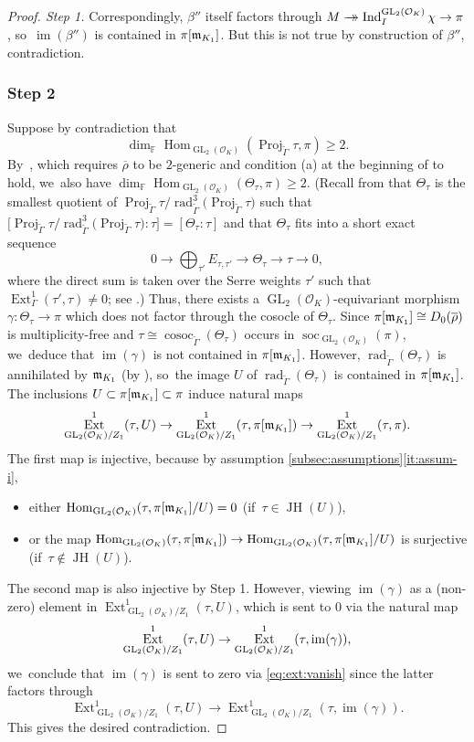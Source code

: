 \documentclass[JEP,XML,SOM,Unicode,NoFloatCountersInSection, NoEqCountersInSection,published]{cedram}
\newcommand{\onto}{\mathchoice{\to\hspace*{-5mm}\to}{\mathrel{\hbox{$\to\hspace*{-2.85mm}\to$}}}{\to\hspace*{-3mm}\to}{\to\hspace*{-3mm}\to}}
\let\wt\widetilde
\newcommand{\F}{\mathbb{F}}
\newcommand{\cO}{\mathcal{O}}
\newcommand{\brho}{\overline{\rho}}
\DeclareMathOperator{\cosoc}{cosoc}
\DeclareMathOperator{\Ext}{Ext}
\DeclareMathOperator{\GL}{GL}
\DeclareMathOperator{\Hom}{Hom}
\DeclareMathOperator{\im}{im}
\DeclareMathOperator{\Ind}{Ind}
\DeclareMathOperator{\JH}{\mathrm{JH}}
\DeclareMathOperator{\Proj}{Proj}
\DeclareMathOperator{\rad}{rad}
\DeclareMathOperator{\soc}{soc}
\theoremstyle{plain}
\theoremstyle{definition}
\begin{document}
\begin{proof}[Proof. Step 1]
Correspondingly, $\beta''$ itself factors through $M\onto \Ind_I^{\GL_2(\cO_K)}\chi\to \pi$, so~$\im(\beta'')$ is contained in $\pi[\mathfrak{m}_{K_1}]$. But this is not true by construction of $\beta''$, contradiction.

\subsubsection*{Step 2} Suppose by contradiction that
\[
\dim_{\F}\Hom_{\GL_2(\cO_K)}(\Proj_{\wt{\Gamma}}\tau,\pi)\geq 2.
\]
By~\cite[Prop.\,4.18]{HuWang2}, which requires $\brho$ to be $2$-generic and condition (a) at the beginning of \cite[\S 4.3]{HuWang2} to hold, we~also have $\dim_{\F}\Hom_{\GL_2(\cO_K)}(\Theta_{\tau},\pi)\geq 2$.
(Recall from \cite[\S 3.3]{HuWang2} that $\Theta_{\tau}$ is the smallest quotient of $\Proj_{\wt{\Gamma}}\tau/\rad^3_{\wt{\Gamma}}\bigl(\Proj_{\wt{\Gamma}}\tau\bigr)$ such that
$\big[\Proj_{\wt{\Gamma}}\tau/\rad^3_{\wt{\Gamma}}\bigl(\Proj_{\wt{\Gamma}}\tau\bigr):\tau\big]=[\Theta_{\tau}:\tau]$
and that $\Theta_{\tau}$ fits into a short exact sequence
\[
0\to \bigoplus_{\tau'}E_{\tau,\tau'}\to \Theta_{\tau}\to \tau\to 0,
\]
where the direct sum is taken over the Serre weights $\tau'$ such that \hbox{$\Ext^1_{\Gamma}(\tau',\tau)\neq0$}; see \cite[Cor.\,3.16]{HuWang2}.)
Thus, there exists a $\GL_2(\cO_K)$-equivariant morphism $\gamma:\Theta_{\tau}\to \pi$ which does not factor through the cosocle of $\Theta_\tau$. Since $\pi[\m_{K_1}]\cong D_0(\brho)$ is multiplicity-free and $\tau\cong \cosoc_{\wt{\Gamma}}(\Theta_\tau)$ occurs in $\soc_{\GL_2(\cO_K)}(\pi)$, we~deduce that $\im(\gamma)$ is not contained in $\pi[\mathfrak{m}_{K_1}]$. However, $\rad_{\wt{\Gamma}}(\Theta_\tau)$ is annihilated by $\mathfrak{m}_{K_1}$ (by \cite[Cor.\,3.16]{HuWang2}), so~the image $U$ of $\rad_{\wt{\Gamma}}(\Theta_\tau)$ is contained in $\pi[\mathfrak{m}_{K_1}]$. The inclusions $U\subset \pi[\mathfrak{m}_{K_1}]\subset \pi$ induce natural maps
\begin{equation}
\label{eq:ext:vanish}
\Ext^1_{\GL_2(\cO_K)/Z_1}(\tau,U)\to \Ext^1_{\GL_2(\cO_K)/Z_1}(\tau,\pi[\m_{K_1}])\to \Ext^1_{\GL_2(\cO_K)/Z_1}(\tau,\pi).
\end{equation}
The first map is injective, because by assumption \ref{subsec:assumptions}\eqref{it:assum-i},
\begin{itemize}
\item
either $\Hom_{\GL_2(\cO_K)}(\tau,\pi[\m_{K_1}]/U)=0$ (if~$\tau\in\JH(U)$),
\item
or the map $\Hom_{\GL_2(\cO_K)}(\tau,\pi[\m_{K_1}])\to \Hom_{\GL_2(\cO_K)}(\tau,\pi[\m_{K_1}]/U)$ is surjective (if~$\tau\notin \JH(U)$).
\end{itemize}
The second map is also injective by Step 1. However, viewing $\im(\gamma)$ as a (non-zero) element in $\Ext^1_{\GL_2(\cO_K)/Z_1}(\tau,U)$, which is sent to $0$ via the natural map
\[
\Ext^1_{\GL_2(\cO_K)/Z_1}(\tau,U)\ra\Ext^1_{\GL_2(\cO_K)/Z_1}(\tau,\im(\gamma)),
\]
we~conclude that $\im(\gamma)$ is sent to zero via \eqref{eq:ext:vanish} since the latter factors through
\[
\Ext^1_{\GL_2(\cO_K)/Z_1}(\tau,U)\to \Ext^1_{\GL_2(\cO_K)/Z_1}(\tau,\im(\gamma)).
\]
This gives the desired contradiction.
\end{proof}
\end{document}
